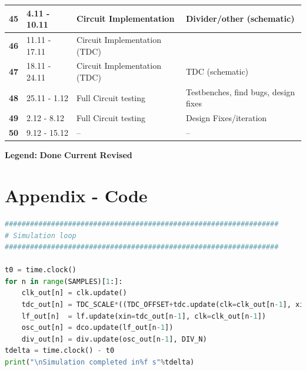 \documentclass[10pt,a4paper]{article}
\begin{document}
\begin{table}
\begin{tabular}{|l|l|l|l|}
			\hline 
			\rule[-1ex]{0pt}{2.5ex} \textbf{45}& 4.11 - 10.11& Circuit Implementation& Divider/other (schematic)\\ 
			\hline 
			\rule[-1ex]{0pt}{2.5ex} \textbf{46}& 11.11 - 17.11& Circuit Implementation (TDC)& \\ 
			\hline 
			\rule[-1ex]{0pt}{2.5ex} \textbf{47}& 18.11 - 24.11& Circuit Implementation (TDC)& TDC (schematic)\\ 
			\hline 
			\rule[-1ex]{0pt}{2.5ex} \textbf{48}& 25.11 - 1.12& Full Circuit testing & Testbenches, find bugs, design fixes\\ 
			\hline 
			\rule[-1ex]{0pt}{2.5ex} \textbf{49}& 2.12 - 8.12& Full Circuit testing& Design Fixes/iteration\\ 
			\hline 
			\rule[-1ex]{0pt}{2.5ex} \textbf{50}& 9.12 - 15.12& --& --\\ 
			\hline 
		\end{tabular}
		\begin{flushleft}\textbf{Legend:} \colorbox{red!20}{\textbf{Done}} \colorbox{green!20}{\textbf{Current}}  \colorbox{blue!20}{\textbf{Revised}}
		\end{flushleft}
	\end{table}  

	\section{Appendix - Code}


    \begin{lstlisting}[language={Python}, caption={excode}, label={Blabla}]
#################################################################
# Simulation loop
#################################################################

t0 = time.clock()
for n in range(SAMPLES)[1:]:
    clk_out[n] = clk.update()
    tdc_out[n] = TDC_SCALE*((TDC_OFFSET+tdc.update(clk=clk_out[n-1], xin=div_out[n-1]))%TDC_STEPS)
    lf_out[n]  = lf.update(xin=tdc_out[n-1], clk=clk_out[n-1])
    osc_out[n] = dco.update(lf_out[n-1])
    div_out[n] = div.update(osc_out[n-1], DIV_N)
tdelta = time.clock() - t0
print("\nSimulation completed in%f s"%tdelta)
    \end{lstlisting}
\end{document}

